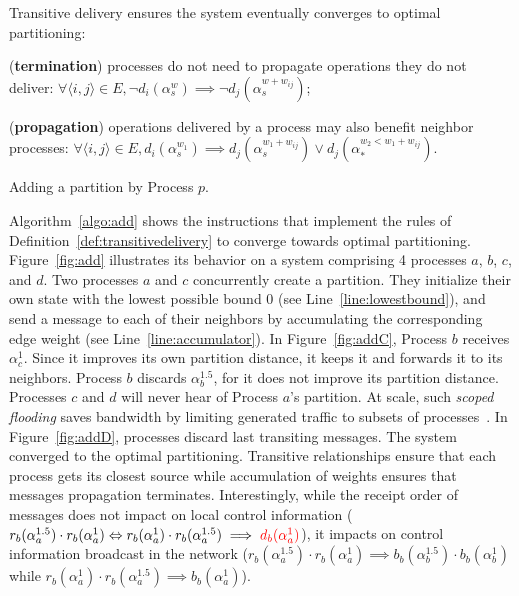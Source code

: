 
\begin{definition}
  Transitive delivery ensures the system eventually converges to
  optimal partitioning:
  \begin{inparaenum}[(i)]
  \item (\textbf{termination}) processes do not need to propagate
    operations they do not deliver: $\forall \langle i, j \rangle \in
    E, \neg d_i(\alpha_{s}^w)\implies \neg
    d_j(\alpha_{s}^{w+w_{ij}})$;
  \item (\textbf{propagation}) operations delivered by a process may
    also benefit neighbor processes: $\forall \langle i, j \rangle \in
    E, d_i(\alpha_{s}^{w_1}) \implies
    d_j(\alpha_{s}^{w_1+w_{ij}}) \vee
    d_j(\alpha_{*}^{w_2 < w_1 + w_{ij}})$.
  \end{inparaenum}
\end{definition}

\begin{algorithm}
  
  \caption{\label{algo:add}Adding a partition by Process $p$.}
\end{algorithm}

Algorithm~\ref{algo:add} shows the instructions that implement the
rules of Definition~\ref{def:transitivedelivery} to converge towards
optimal partitioning. Figure~\ref{fig:add} illustrates its behavior on
a system comprising 4 processes $a$, $b$, $c$, and $d$. Two processes
$a$ and $c$ concurrently create a partition. They initialize their own
state with the lowest possible bound $0$ (see
Line~\ref{line:lowestbound}), and send a message to each of their
neighbors by accumulating the corresponding edge weight (see
Line~\ref{line:accumulator}). In Figure~\ref{fig:addC}, Process $b$
receives $\alpha_{c}^{1}$. Since it improves its own partition
distance, it keeps it and forwards it to its neighbors. Process $b$
discards $\alpha_{b}^{1.5}$, for it does not improve its partition
distance. Processes $c$ and $d$ will never hear of Process $a$'s
partition. At scale, such \emph{scoped flooding} saves bandwidth by
limiting generated traffic to subsets of
processes~\cite{wang2015prodiluvian}. In Figure~\ref{fig:addD},
processes discard last transiting messages. The system converged to
the optimal partitioning.  Transitive relationships ensure that each
process gets its closest source while accumulation of weights ensures
that messages propagation terminates.  Interestingly, while the
receipt order of messages does not impact on local control information
($r_b(\alpha_a^{1.5}) \cdot r_b(\alpha_a^{1}) \Leftrightarrow
r_b(\alpha_a^{1}) \cdot r_b(\alpha_a^{1.5}) \implies
\textcolor{red}{d_b(\alpha_a^{1})}$), it impacts on control information
broadcast in the network ($r_b(\alpha_a^{1.5}) \cdot r_b(\alpha_a^{1})
\implies b_b(\alpha_{b}^{1.5}) \cdot b_b(\alpha_{b}^{1})$ while
$r_b(\alpha_a^{1}) \cdot r_b(\alpha_a^{1.5}) \implies
b_b(\alpha_a^{1})$).

